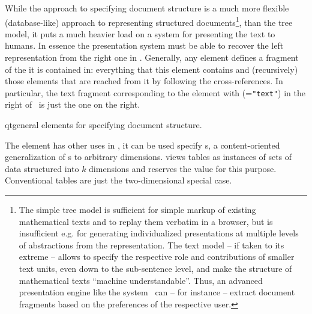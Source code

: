 While the {\omdoc} approach to specifying document structure is a much more
flexible (database-like) approach to representing structured
documents\footnote{The simple tree model is sufficient for simple markup of
  existing mathematical texts and to replay them verbatim in a browser, but is
  insufficient e.g. for generating individualized presentations at multiple levels
  of abstractions from the representation. The {\omdoc} text model -- if taken to
  its extreme -- allows to specify the respective role and contributions of
  smaller text units, even down to the sub-sentence level, and make the structure
  of mathematical texts ``machine understandable''. Thus, an advanced presentation
  engine like the {\activemath} system~\cite{SieBen:acgap00} can -- for instance
  -- extract document fragments based on the preferences of the respective user.},
than the tree model, it puts a much heavier load on a system for presenting the
text to humans. In essence the presentation system must be able to recover the
left representation from the right one in {}. Generally, any
{\omdoc} element defines a fragment of the {\omdoc} it is contained in: everything
that this element contains and (recursively) those elements that are reached from
it by following the cross-references. In particular, the text fragment
corresponding to the element with ({}={\tt{"text"}}) in the
right {\omdoc} of~ is just the one on the right.

\begin{myfig}{qtgeneral}{{\omdoc} elements for specifying  document structure.}
  \quicktable{\generaltable{}}
\end{myfig}

The {} element has other uses in {\omdoc}, it can be used specify
{s}, a content-oriented generalization of {s}
to arbitrary dimensions. {\omdoc} views tables as instances of sets of data
structured into $k$ dimensions and reserves the value
{} for this purpose. Conventional tables are just
the two-dimensional special case.

